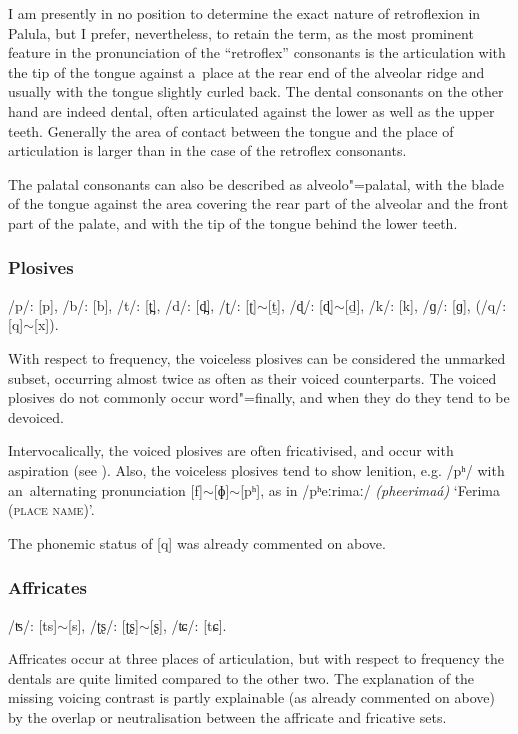 I am presently in no position to determine the exact nature of retroflexion in Palula, but I prefer, nevertheless, to retain the term, as the most prominent feature in the pronunciation of the ``retroflex'' consonants is the articulation with the tip of the tongue against a~place at the rear end of the alveolar ridge and usually with the tongue slightly curled back. The dental consonants on the other hand are indeed dental, often articulated against the lower as well as the upper teeth. Generally the area of contact between the tongue and the place of articulation is larger than in the case of the retroflex consonants.


The palatal consonants can also be described as alveolo"=palatal, with the blade of the tongue against the area covering the rear part of the alveolar and the front part of the palate, and with the tip of the tongue behind the lower teeth. 

\subsubsection*{Plosives}
/p/: [p], /b/: [b], /t/: [t̪], /d/: [d̪], /ʈ/: [ʈ]$\sim$[ṯ], /ɖ/: [ɖ]$\sim$[ḏ], /k/: [k], /ɡ/: [ɡ], (/q/: [q]$\sim$[x]).

With respect to frequency, the voiceless plosives can be considered the unmarked subset, occurring almost twice as often as their voiced counterparts. The voiced plosives do not commonly occur word"=finally, and when they do they tend to be devoiced. 


Intervocalically, the voiced plosives are often fricativised, and occur with aspiration (see ). Also, the voiceless plosives tend to show lenition, e.g. /pʰ/ with an~alternating pronunciation [f]$\sim$[ɸ]$\sim$[pʰ], as in /pʰeːrimaː/ \textit{(pheerimaá)} `Ferima (\textsc{place name)}'. 


The phonemic status of [q] was already commented on above.


\subsubsection*{Affricates}

/ʦ/: [ts]$\sim$[s], /ʈʂ/: [ʈʂ]$\sim$[ʂ], /ʨ/: [tɕ].


Affricates occur at three places of articulation, but with respect to frequency the dentals are quite limited compared to the other two. The explanation of the missing voicing contrast is partly explainable (as already commented on above) by the overlap or neutralisation between the affricate and fricative sets. 



